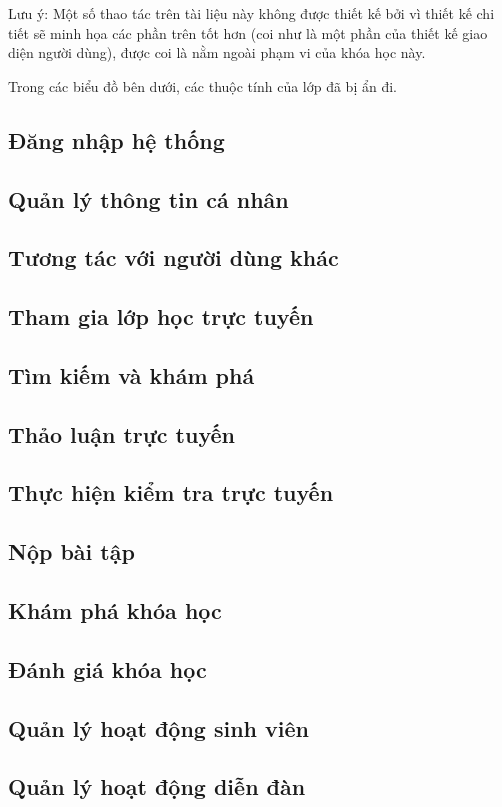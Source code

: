 \documentclass[./../main_file.tex]{subfiles}
\begin{document}
Lưu ý: Một số thao tác trên tài liệu này không được thiết kế bởi vì thiết kế chi tiết sẽ  minh họa các phần trên tốt hơn (coi như là một phần của thiết kế giao diện người dùng), được coi là nằm ngoài phạm vi của khóa học này.

Trong các biểu đồ bên dưới, các thuộc tính của lớp đã bị ẩn đi.

\subsection{Đăng nhập hệ thống}
\subsection{Quản lý thông tin cá nhân}
\subsection{Tương tác với người dùng khác}
\subsection{Tham gia lớp học trực tuyến}
\subsection{Tìm kiếm và khám phá}
\subsection{Thảo luận trực tuyến}
\subsection{Thực hiện kiểm tra trực tuyến}
\subsection{Nộp bài tập}
\subsection{Khám phá khóa học}
\subsection{Đánh giá khóa học}
\subsection{Quản lý hoạt động sinh viên }
\subsection{Quản lý hoạt động diễn đàn}
\end{document}
